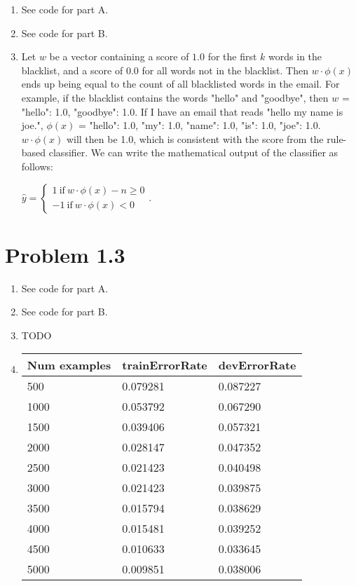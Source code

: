 \documentclass[12pt]{article}
\begin{document}
\begin{enumerate}[label=(\alph*)]
  \item See code for part A.
  \item See code for part B.
  \item Let $w$ be a vector containing a score of $1.0$ for the first $k$ words in the blacklist, and a score of $0.0$ for all words not in the blacklist. Then $w \cdot \phi(x)$ ends up being equal to the count of all blacklisted words in the email. For example, if the blacklist contains the words "hello" and "goodbye", then $w$ = {"hello": 1.0, "goodbye": 1.0}. If I have an email that reads "hello my name is joe.", $\phi(x)$ = {"hello": 1.0, "my": 1.0, "name": 1.0, "is": 1.0, "joe": 1.0}. $w \cdot \phi(x)$ will then be 1.0, which is consistent with the score from the rule-based classifier. We can write the mathematical output of the classifier as follows:

  $\hat y = \left\{ \begin{matrix} 
	1 ~\textrm{if}~ w \cdot \phi(x) - n \ge 0\\
	-1 ~\textrm{if}~ w \cdot \phi(x) < 0
	\end{matrix}\right..$
\end{enumerate}

\section*{Problem 1.3}

\begin{enumerate}[label=(\alph*)]
  \item See code for part A.
  \item See code for part B.

  \item TODO
  \item 
  \begin{tabular}{ l | p{3cm} | p{3cm} }
	    \hline
	    Num examples & trainErrorRate & devErrorRate\\ \hline
	    500 & 0.079281 & 0.087227 \\ \hline
	    1000 & 0.053792 & 0.067290 \\ \hline
	    1500 & 0.039406 & 0.057321 \\ \hline
	    2000 & 0.028147 & 0.047352 \\ \hline
	    2500 & 0.021423 & 0.040498 \\ \hline
	    3000 & 0.021423 & 0.039875 \\ \hline
	    3500 & 0.015794 & 0.038629 \\ \hline
	    4000 & 0.015481 & 0.039252 \\ \hline
	    4500 & 0.010633 & 0.033645 \\ \hline
	    5000 & 0.009851 & 0.038006 \\ \hline
	  \end{tabular}
\end{enumerate}
\end{document}

